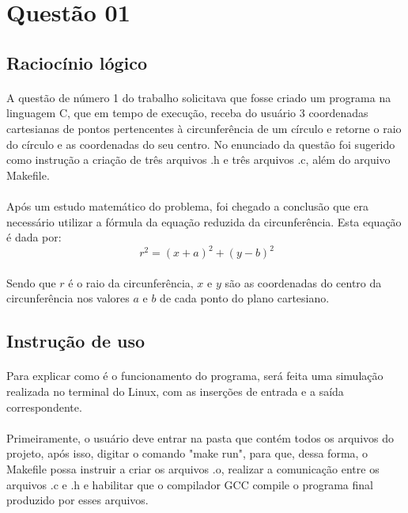 \documentclass[11pt]{article}
\begin{document}
\section{Quest\~ao 01}
	\subsection{Racioc\'inio l\'ogico}
    	\paragraph{}	A quest\~ao de n\'umero 1 do trabalho solicitava que fosse criado um programa na linguagem C, que em tempo de execu\c{c}\~ao, receba do usu\'ario 3 coordenadas cartesianas de pontos pertencentes \`a circunfer\^encia de um c\'irculo e retorne o raio do c\'irculo e as coordenadas do seu centro. No enunciado da quest\~ao foi sugerido como instrução a cria\c{c}\~ao de tr\^es arquivos .h e tr\^es arquivos .c, al\'em do arquivo Makefile.
        \paragraph{}	Ap\'os um estudo matem\'atico do problema, foi chegado a conclus\~ao que era necess\'ario utilizar a f\'ormula da equa\c{c}\~ao reduzida da circunfer\^encia. Esta equa\c{c}\~ao \'e dada por:
         $$\ r^{2} = (x+a)^{2} + (y-b)^{2} $$
        \paragraph{}	Sendo que $r$ \'e o raio da circunfer\^encia, $x$ e $y$ s\~ao as coordenadas do centro da circunfer\^encia nos valores $a$ e $b$ de cada ponto do plano cartesiano. 	\subsection{Instru\c{c}\~ao de uso}
   		\paragraph{}	Para explicar como \'e o funcionamento do programa, ser\'a feita uma simula\c{c}\~ao realizada no terminal do Linux, com as inser\c{c}\~oes de entrada e a sa\'ida correspondente.
        \paragraph{}	Primeiramente, o usu\'ario deve entrar na pasta que cont\'em todos os arquivos do projeto, ap\'os isso, digitar o comando "make run", para que, dessa forma, o Makefile possa instruir a criar os arquivos .o, realizar a comunica\c{c}\~ao entre os arquivos .c e .h e habilitar que o compilador GCC compile o programa final produzido por esses arquivos.
\end{document}
